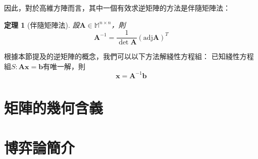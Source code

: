 \documentclass[12pt]{article}
\newcommand{\adj}{\mathrm{adj}}
\newtheorem*{theorem}{定理}
\begin{document}
    因此，對於高維方陣而言，其中一個有效求逆矩陣的方法是伴隨矩陣法：

    \begin{theorem}[伴隨矩陣法]
        設$\mathbf{A}\in\mathbb{M}^{n\times n}$，則$$\mathbf{A}^{-1}=\frac{1}{\det{\mathbf{A}}}(\adj{\mathbf{A}})^T$$
    \end{theorem}

    根據本節提及的逆矩陣的概念，我們可以以下方法解綫性方程組：
    已知綫性方程組$S:\mathbf{Ax}=\mathbf{b}$有唯一解，則$$\mathbf{x}=\mathbf{A}^{-1}\mathbf{b}$$

    \section*{矩陣的幾何含義}

    \section*{博弈論簡介}
\end{document}
